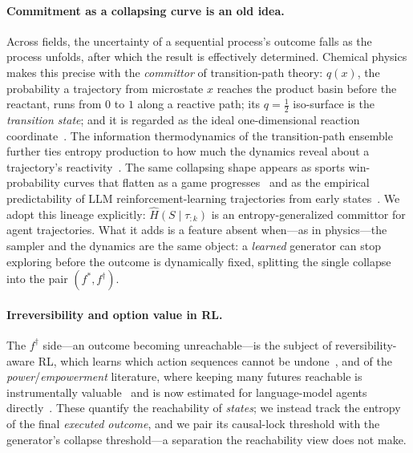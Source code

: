 \documentclass[11pt]{article}
\newcommand{\Hk}{\widehat{H}\!\left(S \mid \tau_{:k}\right)}
\begin{document}
\paragraph{Commitment as a collapsing curve is an old idea.}
Across fields, the uncertainty of a sequential process's outcome falls as the
process unfolds, after which the result is effectively determined. Chemical physics
makes this precise with the \emph{committor} of transition-path theory: $q(x)$, the
probability a trajectory from microstate $x$ reaches the product basin before the
reactant, runs from $0$ to $1$ along a reactive path; its $q\!=\!\tfrac12$
iso-surface is the \emph{transition state}; and it is regarded as the ideal
one-dimensional reaction coordinate~\citep{evanden2010tpt}. The information
thermodynamics of the transition-path ensemble further ties entropy production to
how much the dynamics reveal about a trajectory's
reactivity~\citep{louwerse2022infothermo}. The same collapsing shape appears as
sports win-probability curves that flatten as a game progresses~\citep{brill2024winprob}
and as the empirical predictability of LLM reinforcement-learning trajectories from
early states~\citep{cai2025predictability}. We adopt this lineage explicitly:
$\Hk$ is an entropy-generalized committor for agent trajectories. What it adds is a
feature absent when---as in physics---the sampler and the dynamics are the same
object: a \emph{learned} generator can stop exploring before the outcome is
dynamically fixed, splitting the single collapse into the pair
$(f^\ast,f^\dagger)$.

\paragraph{Irreversibility and option value in RL.}
The $f^\dagger$ side---an outcome becoming unreachable---is the subject of
reversibility-aware RL, which learns which action sequences cannot be
undone~\citep{grinsztajn2021noreturn}, and of the \emph{power}/\emph{empowerment}
literature, where keeping many futures reachable is instrumentally
valuable~\citep{turner2019power} and is now estimated for language-model agents
directly~\citep{song2025empowerment}. These quantify the reachability of \emph{states};
we instead track the entropy of the final \emph{executed outcome}, and we pair its
causal-lock threshold with the generator's collapse threshold---a separation the
reachability view does not make.
\end{document}
